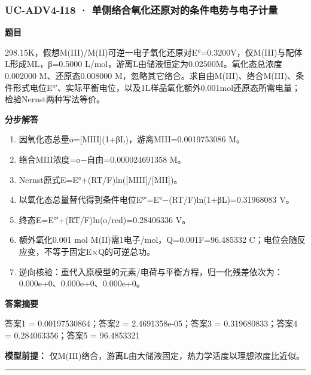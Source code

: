 \documentclass[UTF8,11pt,a4paper]{ctexart}
\begin{document}
\subsubsection*{UC-ADV4-I18 · 单侧络合氧化还原对的条件电势与电子计量}
\noindent\textbf{题目}\par
298.15K，假想M(III)/M(II)可逆一电子氧化还原对E°=0.3200V，仅M(III)与配体L形成ML，β=0.5000 L/mol，游离L由储液恒定为0.02500M。氧化态总浓度0.002000 M、还原态0.008000 M，忽略其它络合。求自由M(III)、络合M(III)、条件形式电位E°′、实际平衡电位，以及1L样品氧化额外0.001mol还原态所需电量；检验Nernst两种写法等价。\par
\medskip\noindent\textbf{分步解答}
\begin{enumerate}
\item 因氧化态总量o=[MIII](1+βL)，游离MIII=0.0019753086 M。
\item 络合MIII浓度=o−自由=0.000024691358 M。
\item Nernst原式E=E°+(RT/F)ln([MIII]/[MII])。
\item 以氧化态总量替代得到条件电位E°′=E°−(RT/F)ln(1+βL)=0.31968083 V。
\item 终态E=E°′+(RT/F)ln(o/red)=0.28406336 V。
\item 额外氧化0.001 mol M(II)需1电子/mol，Q=0.001F=96.485332 C；电位会随反应变，不等于固定E×Q的可逆总功。
\item 逆向核验：重代入原模型的元素/电荷与平衡方程，归一化残差依次为：0.000e+0、0.000e+0、0.000e+0。
\end{enumerate}
\noindent\textbf{答案摘要}\par
答案1 = 0.00197530864；答案2 = 2.4691358e-05；答案3 = 0.319680833；答案4 = 0.284063356；答案5 = 96.4853321\par
\noindent\textbf{模型前提：}
仅M(III)络合，游离L由大储液固定，热力学活度以理想浓度比近似。\par
\medskip\hrule\medskip
{}
\end{document}
